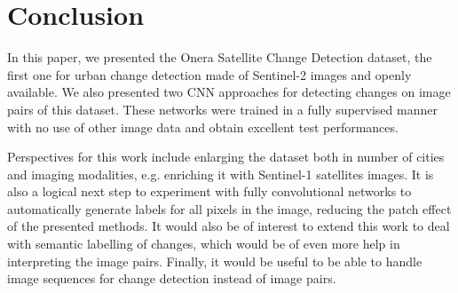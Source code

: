 \documentclass{article}
\begin{document}
\section{Conclusion}
\label{sec:conclusion}


In this paper, we presented the Onera Satellite Change Detection dataset, the first one for urban change detection made of Sentinel-2 images and openly available. We also presented two CNN approaches for detecting changes on image pairs of this dataset. These networks were trained in a fully supervised manner with no use of other image data and obtain excellent test performances.


Perspectives for this work include enlarging the dataset both in number of cities and imaging modalities, e.g. enriching it with Sentinel-1 satellites images.
It is also a logical next step to experiment with fully convolutional networks to automatically generate labels for all pixels in the image, reducing the patch effect of the presented methods. It would also be of interest to extend this work to deal with semantic labelling of changes, which would be of even more help in interpreting the image pairs. Finally, it would be useful to be able to handle image sequences for change detection instead of image pairs.









\end{document}
